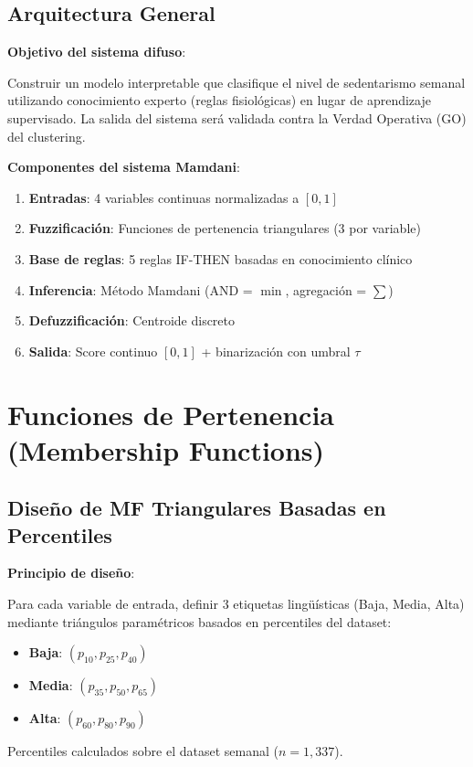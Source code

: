 \documentclass[12pt,letterpaper,twoside]{report}
\begin{document}
\subsection{Arquitectura General}

\begin{hipotesisbox}
\textbf{Objetivo del sistema difuso}:

Construir un modelo interpretable que clasifique el nivel de sedentarismo semanal utilizando conocimiento experto (reglas fisiológicas) en lugar de aprendizaje supervisado. La salida del sistema será validada contra la Verdad Operativa (GO) del clustering.
\end{hipotesisbox}

\begin{estadisticobox}
\textbf{Componentes del sistema Mamdani}:

\begin{enumerate}[noitemsep]
    \item \textbf{Entradas}: 4 variables continuas normalizadas a $[0,1]$
    \item \textbf{Fuzzificación}: Funciones de pertenencia triangulares (3 por variable)
    \item \textbf{Base de reglas}: 5 reglas IF-THEN basadas en conocimiento clínico
    \item \textbf{Inferencia}: Método Mamdani (AND = $\min$, agregación = $\sum$)
    \item \textbf{Defuzzificación}: Centroide discreto
    \item \textbf{Salida}: Score continuo $[0,1]$ + binarización con umbral $\tau$
\end{enumerate}
\end{estadisticobox}

\section{Funciones de Pertenencia (Membership Functions)}

\subsection{Diseño de MF Triangulares Basadas en Percentiles}

\begin{reglabox}
\textbf{Principio de diseño}:

Para cada variable de entrada, definir 3 etiquetas lingüísticas (Baja, Media, Alta) mediante triángulos paramétricos basados en percentiles del dataset:

\begin{itemize}[noitemsep]
    \item \textbf{Baja}: $(p_{10}, p_{25}, p_{40})$
    \item \textbf{Media}: $(p_{35}, p_{50}, p_{65})$
    \item \textbf{Alta}: $(p_{60}, p_{80}, p_{90})$
\end{itemize}

Percentiles calculados sobre el dataset semanal ($n=1,337$).
\end{reglabox}
\end{document}
